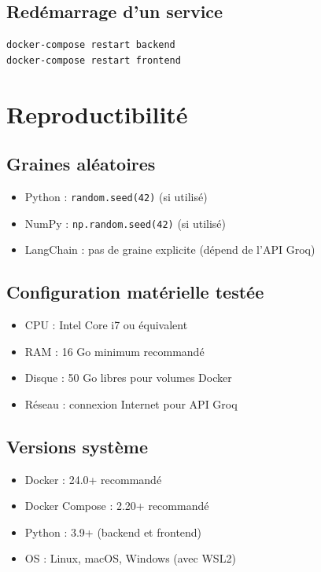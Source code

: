 \subsection{Redémarrage d'un service}
\begin{verbatim}
docker-compose restart backend
docker-compose restart frontend
\end{verbatim}

\section{Reproductibilité}

\subsection{Graines aléatoires}
\begin{itemize}
    \item Python : \texttt{random.seed(42)} (si utilisé)
    \item NumPy : \texttt{np.random.seed(42)} (si utilisé)
    \item LangChain : pas de graine explicite (dépend de l'API Groq)
\end{itemize}

\subsection{Configuration matérielle testée}
\begin{itemize}
    \item CPU : Intel Core i7 ou équivalent
    \item RAM : 16 Go minimum recommandé
    \item Disque : 50 Go libres pour volumes Docker
    \item Réseau : connexion Internet pour API Groq
\end{itemize}

\subsection{Versions système}
\begin{itemize}
    \item Docker : 24.0+ recommandé
    \item Docker Compose : 2.20+ recommandé
    \item Python : 3.9+ (backend et frontend)
    \item OS : Linux, macOS, Windows (avec WSL2)
\end{itemize}

